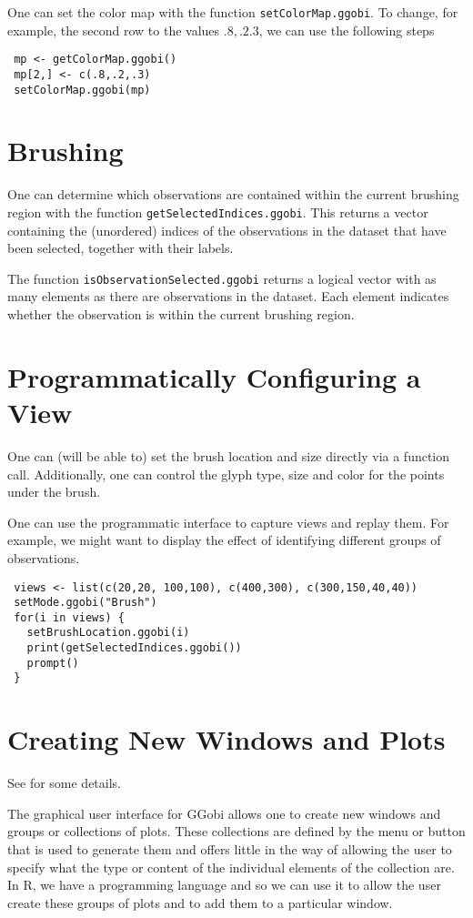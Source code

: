 \documentclass{article}
\def\SFunction#1{{\texttt{\red #1}}}
\begin{document}
One can set the color map with the function
\SFunction{setColorMap.ggobi}.  To change, for example, the second row
to the values $.8, .2. 3$, we can use the following steps
\begin{verbatim}
 mp <- getColorMap.ggobi()
 mp[2,] <- c(.8,.2,.3)
 setColorMap.ggobi(mp)
\end{verbatim}



\section{Brushing}
One can determine which observations are contained within the current
brushing region with the function
\SFunction{getSelectedIndices.ggobi}.  This returns a vector
containing the (unordered) indices of the observations in the dataset
that have been selected, together with their labels.

The function \SFunction{isObservationSelected.ggobi} returns a logical
vector with as many elements as there are observations in the dataset.
Each element indicates whether the observation is within the current
brushing region.




\section{Programmatically Configuring a View} 
One can (will be able to) set the brush location and size directly via
a function call.  Additionally, one can control the glyph type, size
and color for the points under the brush.

One can use the programmatic interface to capture views and replay
them.  For example, we might want to display the effect of identifying
different groups of observations.
\begin{verbatim}
 views <- list(c(20,20, 100,100), c(400,300), c(300,150,40,40))
 setMode.ggobi("Brush")
 for(i in views) {
   setBrushLocation.ggobi(i)
   print(getSelectedIndices.ggobi())
   prompt()
 }
\end{verbatim}

\section{Creating New Windows and Plots}
See  for some details.

The graphical user interface for GGobi allows one to create new
windows and groups or collections of plots.  These collections are
defined by the menu or button that is used to generate them and offers
little in the way of allowing the user to specify what the type or
content of the individual elements of the collection are.  In R, we
have a programming language and so we can use it to allow the user
create these groups of plots and to add them to a particular window.
\end{document}
